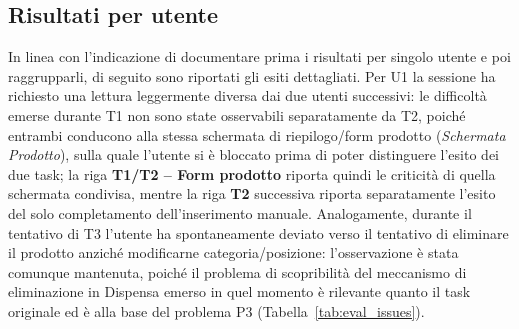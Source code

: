 \documentclass[11pt,a4paper]{article}
\begin{document}
\subsection{Risultati per utente}
\label{subsec:eval_risultati}
In linea con l'indicazione di documentare prima i risultati per singolo utente e poi raggrupparli, di seguito sono riportati gli esiti dettagliati. Per U1 la sessione ha richiesto una lettura leggermente diversa dai due utenti successivi: le difficoltà emerse durante T1 non sono state osservabili separatamente da T2, poiché entrambi conducono alla stessa schermata di riepilogo/form prodotto (\emph{Schermata Prodotto}), sulla quale l'utente si è bloccato prima di poter distinguere l'esito dei due task; la riga \textbf{T1/T2 -- Form prodotto} riporta quindi le criticità di quella schermata condivisa, mentre la riga \textbf{T2} successiva riporta separatamente l'esito del solo completamento dell'inserimento manuale. Analogamente, durante il tentativo di T3 l'utente ha spontaneamente deviato verso il tentativo di eliminare il prodotto anziché modificarne categoria/posizione: l'osservazione è stata comunque mantenuta, poiché il problema di scopribilità del meccanismo di eliminazione in Dispensa emerso in quel momento è rilevante quanto il task originale ed è alla base del problema P3 (Tabella~\ref{tab:eval_issues}).
\end{document}
